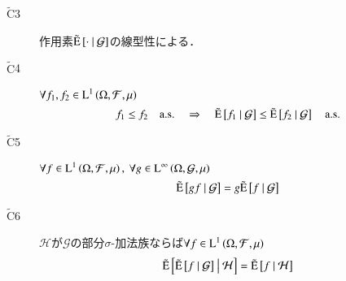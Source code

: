 \begin{prf}
\begin{description}
			\item[$\tilde{\mathrm{C}}$3]	
				作用素$\tcexp{\cdot}{\mathcal{G}}$の線型性による．

			\item[$\tilde{\mathrm{C}}$4]	$\forall f_1,f_2 \in \Lp{1}{\Omega, \mathcal{F},\mu}$
				\begin{align}
					f_1 \leq f_2 \quad \mathrm{a.s.} \quad \Rightarrow \quad \tcexp{f_1}{\mathcal{G}} \leq \tcexp{f_2}{\mathcal{G}} \quad \mathrm{a.s.}
				\end{align}
			
			\item[$\tilde{\mathrm{C}}$5]	$\forall f \in \Lp{1}{\Omega, \mathcal{F},\mu},\ \forall g \in \Lp{\infty}{\Omega, \mathcal{G},\mu}$
				\begin{align}
					\tcexp{gf}{\mathcal{G}} = g\tcexp{f}{\mathcal{G}}
				\end{align}
			
			\item[$\tilde{\mathrm{C}}$6]	$\mathcal{H}$が$\mathcal{G}$の部分$\sigma$-加法族ならば$\forall f \in \Lp{1}{\Omega, \mathcal{F},\mu}$
				\begin{align}
					\tcexp{\tcexp{f}{\mathcal{G}}}{\mathcal{H}} = \tcexp{f}{\mathcal{H}}
				\end{align}
		\end{description}
	\end{prf}